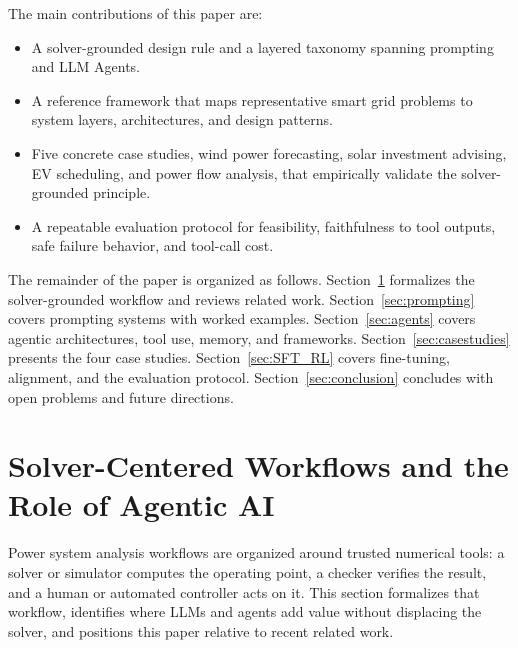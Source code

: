 \documentclass[journal,onecolumn]{IEEEtran} %
\begin{document}

The main contributions of this paper are:

\begin{itemize}
  \item A solver-grounded design rule and a layered taxonomy spanning prompting and LLM Agents.
  \item A reference framework that maps representative smart grid problems to system layers, architectures, and design patterns.
  \item Five concrete case studies, wind power forecasting, solar investment advising, EV scheduling, and power flow analysis, that empirically validate the solver-grounded principle.
  \item A repeatable evaluation protocol for feasibility, faithfulness to tool outputs, safe failure behavior, and tool-call cost.
\end{itemize}

The remainder of the paper is organized as follows. Section~\ref{sec:workflow} formalizes the solver-grounded workflow and reviews related work. Section~\ref{sec:prompting} covers prompting systems with worked examples. Section~\ref{sec:agents} covers agentic architectures, tool use, memory, and frameworks. Section~\ref{sec:casestudies} presents the four case studies. Section~\ref{sec:SFT_RL} covers fine-tuning, alignment, and the evaluation protocol. Section~\ref{sec:conclusion} concludes with open problems and future directions.

\section{Solver-Centered Workflows and the Role of Agentic AI}
\label{sec:workflow}
Power system analysis workflows are organized around trusted numerical tools: a solver or simulator computes the operating point, a checker verifies the result, and a human or automated controller acts on it. This section formalizes that workflow, identifies where LLMs and agents add value without displacing the solver, and positions this paper relative to recent related work.
\end{document}
